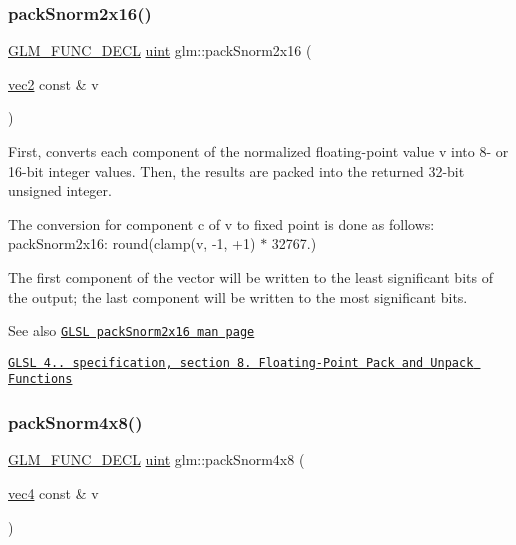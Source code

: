 \subsubsection{\texorpdfstring{pack\+Snorm2x16()}{packSnorm2x16()}}
{\footnotesize\ttfamily \hyperlink{setup_8hpp_ab2d052de21a70539923e9bcbf6e83a51}{G\+L\+M\+\_\+\+F\+U\+N\+C\+\_\+\+D\+E\+CL} \hyperlink{group__core__precision_ga4fd29415871152bfb5abd588334147c8}{uint} glm\+::pack\+Snorm2x16 (\begin{DoxyParamCaption}\item[{\hyperlink{group__core__types_gaa1618f51db67eaa145db101d8c8431d8}{vec2} const \&}]{v }\end{DoxyParamCaption})}

First, converts each component of the normalized floating-\/point value v into 8-\/ or 16-\/bit integer values. Then, the results are packed into the returned 32-\/bit unsigned integer.

The conversion for component c of v to fixed point is done as follows\+: pack\+Snorm2x16\+: round(clamp(v, -\/1, +1) $\ast$ 32767.)

The first component of the vector will be written to the least significant bits of the output; the last component will be written to the most significant bits.

\begin{DoxySeeAlso}{See also}
\href{http://www.opengl.org/sdk/docs/manglsl/xhtml/packSnorm2x16.xml}{\tt G\+L\+SL pack\+Snorm2x16 man page} 

\href{http://www.opengl.org/registry/doc/GLSLangSpec.4.20.8.pdf}{\tt G\+L\+SL 4.. specification, section 8. Floating-\/\+Point Pack and Unpack Functions} 
\end{DoxySeeAlso}
\mbox{\label{group__core__func__packing_ga85e8f17627516445026ab7a9c2e3531a}} 
\subsubsection{\texorpdfstring{pack\+Snorm4x8()}{packSnorm4x8()}}
{\footnotesize\ttfamily \hyperlink{setup_8hpp_ab2d052de21a70539923e9bcbf6e83a51}{G\+L\+M\+\_\+\+F\+U\+N\+C\+\_\+\+D\+E\+CL} \hyperlink{group__core__precision_ga4fd29415871152bfb5abd588334147c8}{uint} glm\+::pack\+Snorm4x8 (\begin{DoxyParamCaption}\item[{\hyperlink{group__core__types_ga5881b1b022d7fd1b7218f5916532dd02}{vec4} const \&}]{v }\end{DoxyParamCaption})}

